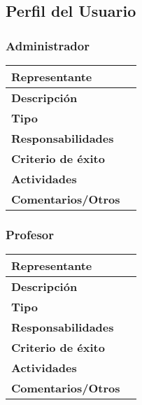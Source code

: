 \documentclass{article}
\begin{document}
	\subsection{Perfil del Usuario}

	\subsubsection{Administrador}
	\begin{center}
		\begin{tabular}{| p{} | p{}|}
		 \hline  %
		\raggedright
		\textbf{Representante} & 
		\\ \hline
		\textbf{Descripción} & \\ \hline
		\textbf{Tipo} &  \\ \hline
		\textbf{Responsabilidades} & \\ \hline
		\textbf{Criterio de éxito} & \\ \hline
		\textbf{Actividades} &  \\ \hline
		\textbf{Comentarios/Otros} &  \\ \hline
		\end{tabular}
	\end{center}

	\subsubsection{Profesor}
	\begin{center}
		\begin{tabular}{| p{} | p{}|}
		 \hline  %
		\raggedright
		\textbf{Representante} & 
		\\ \hline
		\textbf{Descripción} & \\ \hline
		\textbf{Tipo} &  \\ \hline
		\textbf{Responsabilidades} & \\ \hline
		\textbf{Criterio de éxito} & \\ \hline
		\textbf{Actividades} & \\ \hline
		\textbf{Comentarios/Otros} & \\ \hline
		\end{tabular}
	\end{center}
\end{document}
